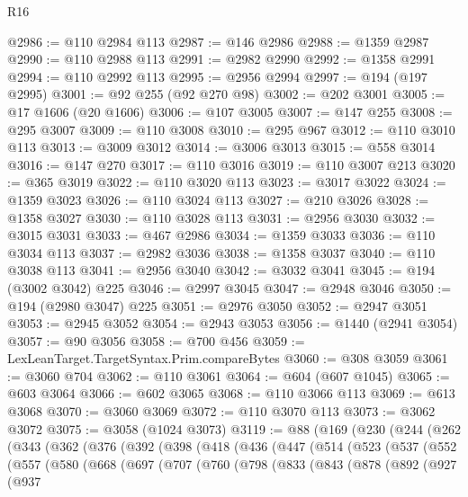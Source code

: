 \begin{lexlean}{R16}
\begin{coremodule}
@2986 := @110 @2984 @113
@2987 := @146 @2986
@2988 := @1359 @2987
@2990 := @110 @2988 @113
@2991 := @2982 @2990
@2992 := @1358 @2991
@2994 := @110 @2992 @113
@2995 := @2956 @2994
@2997 := @194 (@197 @2995)
@3001 := @92 @255 (@92 @270 @98)
@3002 := @202 @3001
@3005 := @17 @1606 (@20 @1606)
@3006 := @107 @3005
@3007 := @147 @255
@3008 := @295 @3007
@3009 := @110 @3008
@3010 := @295 @967
@3012 := @110 @3010 @113
@3013 := @3009 @3012
@3014 := @3006 @3013
@3015 := @558 @3014
@3016 := @147 @270
@3017 := @110 @3016
@3019 := @110 @3007 @213
@3020 := @365 @3019
@3022 := @110 @3020 @113
@3023 := @3017 @3022
@3024 := @1359 @3023
@3026 := @110 @3024 @113
@3027 := @210 @3026
@3028 := @1358 @3027
@3030 := @110 @3028 @113
@3031 := @2956 @3030
@3032 := @3015 @3031
@3033 := @467 @2986
@3034 := @1359 @3033
@3036 := @110 @3034 @113
@3037 := @2982 @3036
@3038 := @1358 @3037
@3040 := @110 @3038 @113
@3041 := @2956 @3040
@3042 := @3032 @3041
@3045 := @194 (@3002 @3042) @225
@3046 := @2997 @3045
@3047 := @2948 @3046
@3050 := @194 (@2980 @3047) @225
@3051 := @2976 @3050
@3052 := @2947 @3051
@3053 := @2945 @3052
@3054 := @2943 @3053
@3056 := @1440 (@2941 @3054)
@3057 := @90 @3056
@3058 := @700 @456
@3059 := LexLeanTarget.TargetSyntax.Prim.compareBytes
@3060 := @308 @3059
@3061 := @3060 @704
@3062 := @110 @3061
@3064 := @604 (@607 @1045)
@3065 := @603 @3064
@3066 := @602 @3065
@3068 := @110 @3066 @113
@3069 := @613 @3068
@3070 := @3060 @3069
@3072 := @110 @3070 @113
@3073 := @3062 @3072
@3075 := @3058 (@1024 @3073)
@3119 := @88
    (@169
      (@230
        (@244
          (@262
            (@343
              (@362
                (@376
                  (@392
                    (@398
                      (@418
                        (@436
                          (@447
                            (@514
                              (@523
                                (@537
                                  (@552
                                    (@557
                                      (@580
                                        (@668
                                          (@697
                                            (@707
                                              (@760
                                                (@798
                                                  (@833
                                                    (@843
                                                      (@878
                                                        (@892
                                                          (@927
                                                            (@937

\end{coremodule}
\end{lexlean}
